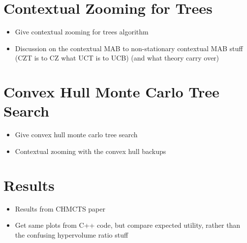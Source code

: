 \section{Contextual Zooming for Trees}
\label{sec:5-3-czt}

    \begin{itemize}
        \item Give contextual zooming for trees algorithm
        \item Discussion on the contextual MAB to non-stationary contextual MAB stuff (CZT is to CZ what UCT is to UCB) (and what theory carry over)
    \end{itemize}

\section{Convex Hull Monte Carlo Tree Search}
\label{sec:5-4-theory}

    \begin{itemize}
        \item Give convex hull monte carlo tree search
        \item Contextual zooming with the convex hull backups
    \end{itemize}

\section{Results}
\label{sec:5-5-results}

    \begin{itemize}
        \item Results from CHMCTS paper
        \item Get same plots from C++ code, but compare expected utility, rather than the confusing hypervolume ratio stuff
    \end{itemize}